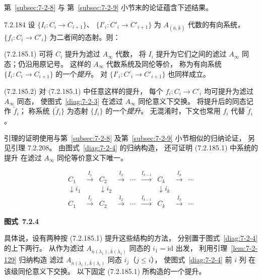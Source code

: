 第~\ref{subsec:7-2-8} 与
第~\ref{subsec:7-2-9} 小节末的论证蕴含下述结果。

\begin{lemma}{7.2.184}\label{lem:7-2-184}
设 $\{I_i\colon C_i\to C_{i+1}\}$、
$\{I'_i\colon C'_i\to C'_{i+1}\}$
为 $A_{(\bar n,\bar k)}$ 代数的有向系统，
$\{f_i\colon C_i\to C'_i\}$
为二者间的态射。则：

\noindent\textup{(7.2.185.1)}
可将 $C_i$ 提升为滤过 $A_\infty$ 代数，
将 $I_i$ 提升为它们之间的滤过
$A_\infty$ 同态；仍沿用原记号。
这样的 $A_\infty$ 代数系统及同伦等价，
称为有向系统 $\{I_i\colon C_i\to C_{i+1}\}$
的一个\emph{提升}。
对 $\{I'_i\colon C'_i\to C'_{i+1}\}$
也同样成立。

\noindent\textup{(7.2.185.2)}
对 (7.2.185.1) 中任意这样的提升，
每个 $f_i\colon C_i\to C'_i$
均可提升为滤过 $A_\infty$ 同态，
使图式~\ref{diag:7-2-3}
在滤过 $A_\infty$ 同伦意义下交换。
将提升后的同态记作 $\widetilde f_i$；
称系统 $\{\widetilde f_i\}$
为态射 $\{f_i\}$ 的一个\emph{提升}。
无混淆时，下文也常用 $f_i$ 代替
$\widetilde f_i$。
\end{lemma}

引理的证明使用与第~\ref{subsec:7-2-8}
及第~\ref{subsec:7-2-9} 小节相似的归纳论证，
另见引理 7.2.208。
由图式~\ref{diag:7-2-4} 的归纳构造，
还可证明 (7.2.185.1) 中系统的提升
在滤过 $A_\infty$ 同伦等价意义下唯一。

\par\medskip\noindent\begin{minipage}{\textwidth}
\centering
\[
\begin{array}{ccccccccc}
C_1&\xrightarrow{I_1}&C_2&\xrightarrow{I_2}&\cdots
&\xrightarrow{I_{k-1}}&C_k&\xrightarrow{I_k}&\cdots\\[1ex]
\downarrow i_1&&\downarrow i_2&&&&\downarrow i_k&&\\[-0.3ex]
C_1&\xrightarrow{I_1}&C_2&\xrightarrow{I_2}&\cdots
&\xrightarrow{I_{k-1}}&C_k&\xrightarrow{I_k}&\cdots
\end{array}
\]
\par{\renewcommand{\thefigure}{7.2.4}
\normalfont\bfseries 图式~\thefigure\label{diag:7-2-4}}
\end{minipage}\par\medskip

具体说，设有两种按 (7.2.185.1)
提升这些结构的方法，
分别置于图式~\ref{diag:7-2-4} 的上下两行。
从作为滤过
$A_{\bar n(\lambda_1),\bar k(\lambda_1)}$
同态的 $i_1=\mathrm{id}$ 出发，
利用引理~\ref{lem:7-2-129} 归纳构造
滤过 $A_{\bar n(\lambda_i),\bar k(\lambda_i)}$
同态 $i_j$（$j\le i$），
使图式~\ref{diag:7-2-4} 前 $i$ 列
在该级同伦意义下交换。
以下固定 (7.2.185.1) 所构造的一个提升。

